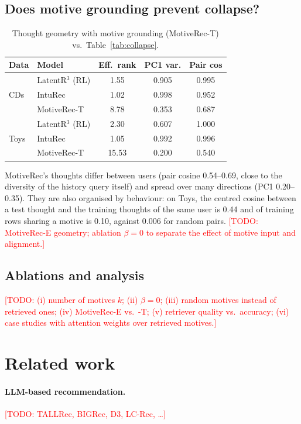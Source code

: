 \documentclass[10pt,twocolumn]{article}
\newcommand{\todo}[1]{\textcolor{red}{[TODO: #1]}}
\begin{document}
\subsection{Does motive grounding prevent collapse?}
\begin{table}[t]
\centering\small
\caption{Thought geometry with motive grounding (MotiveRec-T) vs.\ Table~\ref{tab:collapse}.}
\label{tab:geometry}
\begin{tabular}{llccc}
\toprule
Data & Model & Eff.\ rank & PC1 var. & Pair cos \\
\midrule
\multirow{3}{*}{CDs}  & LatentR$^3$ (RL) & 1.55 & 0.905 & 0.995 \\
                      & IntuRec          & 1.02 & 0.998 & 0.952 \\
                      & MotiveRec-T      & 8.78 & 0.353 & 0.687 \\
\midrule
\multirow{3}{*}{Toys} & LatentR$^3$ (RL) & 2.30 & 0.607 & 1.000 \\
                      & IntuRec          & 1.05 & 0.992 & 0.996 \\
                      & MotiveRec-T      & 15.53 & 0.200 & 0.540 \\
\bottomrule
\end{tabular}
\end{table}
MotiveRec's thoughts differ between users (pair cosine 0.54--0.69, close to the diversity of the history
query itself) and spread over many directions (PC1 0.20--0.35). They are also organised by
behaviour: on Toys, the centred cosine between a test thought and the training thoughts of the same user
is 0.44 and of training rows sharing a motive is 0.10, against 0.006 for random pairs.
\todo{MotiveRec-E geometry; ablation $\beta=0$ to separate the effect of motive input and alignment.}

\subsection{Ablations and analysis}
\todo{(i) number of motives $k$; (ii) $\beta=0$; (iii) random motives instead of retrieved ones;
(iv) MotiveRec-E vs.\ -T; (v) retriever quality vs.\ accuracy; (vi) case studies with attention weights
over retrieved motives.}

\section{Related work}
\paragraph{LLM-based recommendation.} \todo{TALLRec, BIGRec, D3, LC-Rec, \dots}
\end{document}
